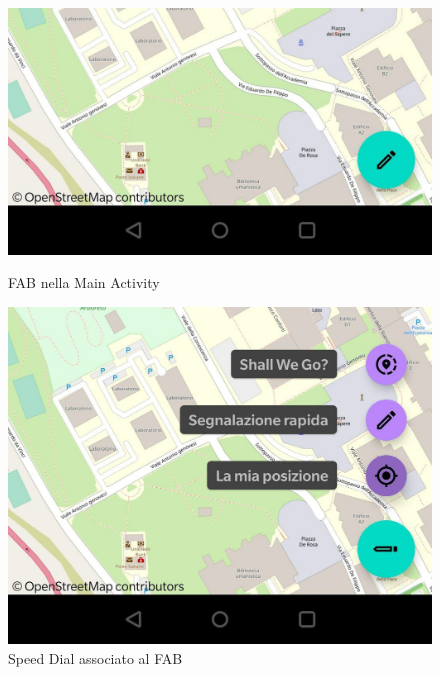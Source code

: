                     \begin{figure}[ht]
                        \begin{minipage}[b]{0.45\linewidth}
                          \includegraphics[width=1.0\textwidth]{capitolo4/figure/fab.jpg}
                            \centering
                          \caption{FAB nella Main Activity}
                          \label{fig:FAB nella Main Activity}
                        \end{minipage}
                        \quad
                        \begin{minipage}[b]{0.45\linewidth}
                           \includegraphics[width=1.0\textwidth]{capitolo4/figure/speeddial.jpg}
                           \centering
                         \caption{Speed Dial associato al FAB}
                         \label{fig:Speed Dial associato al FAB}
                       \end{minipage}
                       \end{figure}
        \newpage

